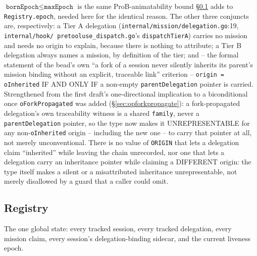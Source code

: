 \documentclass[a4paper,10pt,fleqn]{article}
\newcommand{\fpath}[1]{\texttt{#1}}
\newcommand{\field}[1]{\texttt{#1}}
\begin{document}
$\field{bornEpoch} \leq \field{maxEpoch}$ is the same ProB-animatability bound
\S\ref{sec:registry} adds to \field{Registry.epoch}, needed here for
the identical reason. The other three conjuncts are, respectively: a
Tier A delegation
(\fpath{internal/mission/delegation.go}:19, \fpath{internal/hook/
pretooluse\_dispatch.go}'s \field{dispatchTierA}) carries no mission and
needs no origin to explain, because there is nothing to attribute; a
Tier B delegation always names a mission, by definition of the tier;
and -- the formal statement of the bead's own ``a fork of a session
never silently inherits its parent's mission binding without an
explicit, traceable link'' criterion -- \field{origin = oInherited}
IF AND ONLY IF a non-empty \field{parentDelegation} pointer is carried.
Strengthened from the first draft's one-directional implication to a
biconditional once \field{oForkPropagated} was added
(\S\ref{sec:opforkpropagate}): a fork-propagated delegation's own
traceability witness is a shared \field{family}, never a
\field{parentDelegation} pointer, so the type now makes it
UNREPRESENTABLE for any non-\field{oInherited} origin -- including the
new one -- to carry that pointer at all, not merely unconventional.
There is no value of \field{ORIGIN} that lets a delegation claim
``inherited'' while leaving the chain unrecorded, nor one that lets a
delegation carry an inheritance pointer while claiming a DIFFERENT
origin: the type itself makes a silent or a misattributed inheritance
unrepresentable, not merely disallowed by a guard that a caller could
omit.

\subsection{Registry}
\label{sec:registry}

The one global state: every tracked session, every tracked delegation,
every mission claim, every session's delegation-binding sidecar, and
the current liveness epoch.
\end{document}
